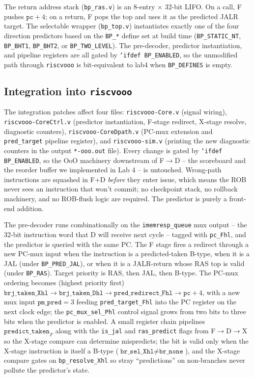 \documentclass[10pt]{article}
\begin{document}
The return address stack (\texttt{bp\_ras.v}) is an 8-entry
$\times$ 32-bit LIFO. On a call, F pushes $\texttt{pc}+4$; on a
return, F pops the top and uses it as the predicted JALR target. The
selectable wrapper (\texttt{bp\_top.v}) instantiates exactly one of
the four direction predictors based on the \texttt{BP\_*} define set
at build time (\texttt{BP\_STATIC\_NT}, \texttt{BP\_BHT1},
\texttt{BP\_BHT2}, or \texttt{BP\_TWO\_LEVEL}). The pre-decoder,
predictor instantiation, and pipeline registers are all gated by
\texttt{`ifdef BP\_ENABLED}, so the unmodified path through
\texttt{riscvooo} is bit-equivalent to lab4 when \texttt{BP\_DEFINES}
is empty.

\subsection{Integration into \texttt{riscvooo}}

The integration patches affect four files:
\texttt{riscvooo-Core.v} (signal wiring),
\texttt{riscvooo-CoreCtrl.v} (predictor instantiation, F-stage
redirect, X-stage resolve, diagnostic counters),
\texttt{riscvooo-CoreDpath.v} (PC-mux extension and
\texttt{pred\_target} pipeline register), and
\texttt{riscvooo-sim.v} (printing the new diagnostic counters in the
output \texttt{*-ooo.out} file). Every change is gated by
\texttt{`ifdef BP\_ENABLED}, so the OoO machinery downstream of
F$\rightarrow$D -- the scoreboard and the reorder buffer we
implemented in Lab 4 -- is untouched. Wrong-path instructions are
squashed in F+D \emph{before} they enter issue, which means the ROB
never sees an instruction that won't commit; no checkpoint stack,
no rollback machinery, and no ROB-flush logic are required. The
predictor is purely a front-end addition.

The pre-decoder runs combinationally on the
\texttt{imemresp\_queue} mux output -- the 32-bit instruction word
that D will receive next cycle -- tagged with \texttt{pc\_Fhl}, and
the predictor is queried with the same PC. The F stage fires a
redirect through a new PC-mux input when the instruction is a
predicted-taken B-type, when it is a JAL (under \texttt{BP\_PRED\_JAL}),
or when it is a JALR-return whose RAS top is valid (under
\texttt{BP\_RAS}). Target priority is RAS, then JAL, then B-type. The
PC-mux ordering becomes (highest priority first)
$\texttt{brj\_taken\_Xhl} \!\to\!
 \texttt{brj\_taken\_Dhl} \!\to\!
 \texttt{pred\_redirect\_Fhl} \!\to\!
 \texttt{pc}+4$, with a new mux input
$\texttt{pm\_pred} = 3$ feeding \texttt{pred\_target\_Fhl} into the PC
register on the next clock edge; the \texttt{pc\_mux\_sel\_Phl}
control signal grows from two bits to three bits when the predictor
is enabled. A small register chain pipelines
$\texttt{predict\_taken}_{\!F}$ along with the \texttt{is\_jal} and
\texttt{ras\_predict} flags from F$\rightarrow$D$\rightarrow$X so
the X-stage compare can determine mispredicts; the bit is valid only
when the X-stage instruction is itself a B-type
($\texttt{br\_sel\_Xhl} \neq \texttt{br\_none}$), and the X-stage
compare gates on \texttt{bp\_resolve\_Xhl} so stray ``predictions''
on non-branches never pollute the predictor's state.
\end{document}

